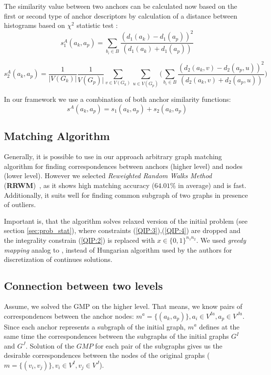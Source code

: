 The similarity value between two anchors can be calculated now based on the first or second type of anchor descriptors by calculation of a distance between histograms based on $\chi^2$ statistic test \cite{Weken2004_ChiSqTest}:
\begin{equation}
s^A_1(a_k, a_p) = \sum_{b_i\in B}\frac{(d_1(a_k)-d_1(a_p))^2}{(d_1(a_k)+d_1(a_p))}
\end{equation}

\begin{equation}
s^A_2(a_k, a_p) = \frac{1}{|V(G_k)|}\frac{1}{V(G_p)|}\sum_{v\in V(G_k)}\sum_{u\in V(G_p)} \big(\sum_{b_i\in B}\frac{(d_2(a_k,v)-d_2(a_p,u))^2}{(d_2(a_k,v)+d_2(a_p,u))}\big)
\end{equation}

In our framework we use a combination of both anchor similarity functions:
\begin{equation}
s^A(a_k, a_p) = s_1(a_k, a_p)+s_2(a_k, a_p) 
\end{equation}


\subsection{Matching Algorithm}

Generally, it is possible to use in our approach arbitrary graph matching algorithm for finding correspondences between anchors (higher level) and nodes (lower level). However we selected \emph{Reweighted Random Walks Method} (\textbf{RRWM})~\cite{Cho2010_RRWM}, as it shows high matching accuracy ($64.01\%$ in average) and is fast. Additionally, it	 suits well for finding common subgraph of two graphs in presence of outliers.

Important is, that the algorithm solves relaxed version of the initial problem (see section \ref{sec:prob_stat}), where constraints (\ref{QIP:3}),(\ref{QIP:4}) are dropped and the integrality constrain (\ref{QIP:2}) is replaced with $x\in \{0,1\}^{n_1n_2}$. We used \emph{greedy mapping} analog to \cite{Leordeanu2005}, instead of Hungarian algorithm used by the authors for discretization of continues solutions.

\subsection{Connection between two levels}
Assume, we solved the GMP on the higher level. That means, we know pairs of correspondences between the anchor nodes: $m^a = \{(a_k, a_p)\}, a_i\in V^{Ia}, a_p\in V^{Ja}$. Since each anchor represents a subgraph of the initial graph, $m^a$ defines at the same time the correspondences between the subgraphs of the initial graphs $G^I$ and $G^J$. Solution of the $GMP$ for each pair of the subgraphs gives us the desirable correspondences between the nodes of the original graphs ($m = \{(v_i, v_j)\}, v_i\in V^{I}, v_j\in V^{J}$).

